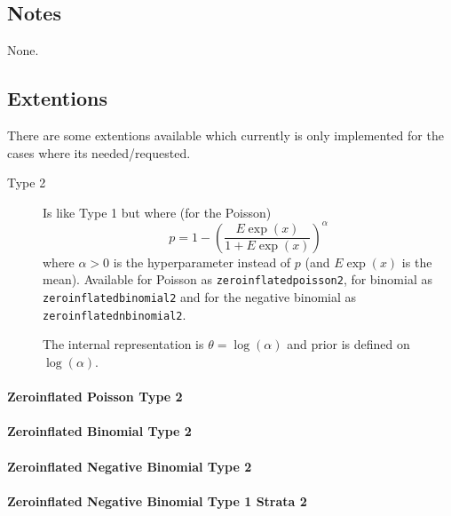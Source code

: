 \documentclass[a4paper,11pt]{article}
\begin{document}
\subsection*{Notes}

None.




\subsection*{Extentions}

There are some extentions available which currently is only
implemented for the cases where its needed/requested.
\begin{description}
\item[Type 2] Is like Type 1 but where (for the Poisson)
    \begin{displaymath}
        p = 1-\left( \frac{E\exp(x)}{1 + E\exp(x)}\right)^{\alpha}
    \end{displaymath}
    where $\alpha > 0$ is the hyperparameter instead of $p$ (and
    $E\exp(x)$ is the mean).  Available for Poisson as
    \texttt{zeroinflatedpoisson2}, for binomial as
    \texttt{zeroinflatedbinomial2} and for the negative binomial as
    \texttt{zeroinflatednbinomial2}.

    The internal representation is $\theta = \log(\alpha)$ and prior
    is defined on $\log(\alpha)$.
\end{description}

\paragraph{Zeroinflated Poisson Type 2}


\paragraph{Zeroinflated Binomial Type 2}


\paragraph{Zeroinflated Negative Binomial Type 2}


\paragraph{Zeroinflated Negative Binomial Type 1 Strata 2}

\end{document}
